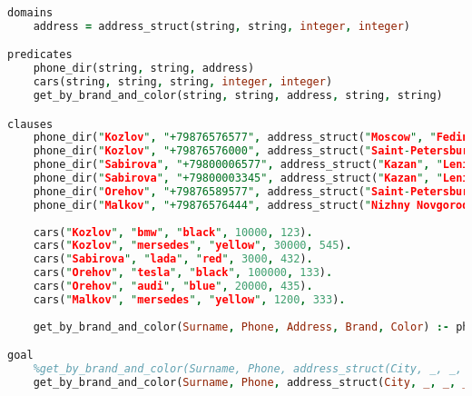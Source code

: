 \documentclass[12pt]{report}
\begin{document}
\begin{lstlisting}[language=Prolog]
domains
	address = address_struct(string, string, integer, integer)

predicates
	phone_dir(string, string, address)
	cars(string, string, string, integer, integer)
	get_by_brand_and_color(string, string, address, string, string)

clauses
	phone_dir("Kozlov", "+79876576577", address_struct("Moscow", "Fedina", 55, 23)).
	phone_dir("Kozlov", "+79876576000", address_struct("Saint-Petersburg", "Mira", 4, 12)).
	phone_dir("Sabirova", "+79800006577", address_struct("Kazan", "Leninskaya", 31, 33)).
	phone_dir("Sabirova", "+79800003345", address_struct("Kazan", "Leninskaya", 31, 33)).
	phone_dir("Orehov", "+79876589577", address_struct("Saint-Petersburg", "Annikova", 23, 4)).
	phone_dir("Malkov", "+79876576444", address_struct("Nizhny Novgorod", "Annikova", 48, 1)).
	
	cars("Kozlov", "bmw", "black", 10000, 123).
	cars("Kozlov", "mersedes", "yellow", 30000, 545).
	cars("Sabirova", "lada", "red", 3000, 432).
	cars("Orehov", "tesla", "black", 100000, 133).
	cars("Orehov", "audi", "blue", 20000, 435).
	cars("Malkov", "mersedes", "yellow", 1200, 333).
	
	get_by_brand_and_color(Surname, Phone, Address, Brand, Color) :- phone_dir(Surname, Phone, Address), cars(Surname, Brand, Color, _, _).

goal
	%get_by_brand_and_color(Surname, Phone, address_struct(City, _, _, _), "lada", "red").
	get_by_brand_and_color(Surname, Phone, address_struct(City, _, _, _), "mersedes", "yellow").
\end{lstlisting}


	
\end{document}
